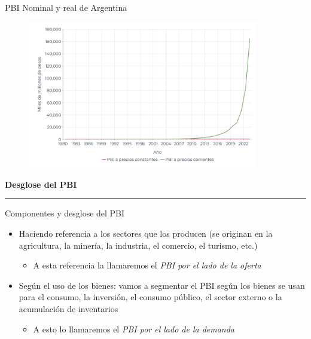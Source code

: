 \documentclass{beamer}
\begin{document}
\begin{frame}{PBI Nominal y real de Argentina}
    \begin{figure} [H]   \includegraphics[width=0.9\textwidth]{Slides Principios de Economia/Figures/29.9.pdf}
\end{figure}
\end{frame}

\begin{frame}{}
\centering\huge\textbf{Desglose del PBI} 
\vspace{2mm}
\hrule
\end{frame}

\begin{frame}{Componentes y desglose del PBI}
    \begin{itemize}
    \item Haciendo referencia a los sectores que los producen (se originan en la agricultura, la minería, la industria, el comercio, el turismo, etc.) 
        \begin{itemize} \vspace{1mm}
            \item A esta referencia la llamaremos el \textit{PBI por el lado de la oferta}
        \end{itemize} \vspace{2mm}
     \item Según el uso de los bienes: vamos a segmentar el PBI según los bienes se usan para el consumo, la  inversión, el consumo público, el sector externo o la acumulación de inventarios \vspace{1mm}
     \begin{itemize}
            \item A esto lo llamaremos el \textit{PBI por el lado de la demanda}
        \end{itemize}
\end{itemize}
\end{frame}
\end{document}
